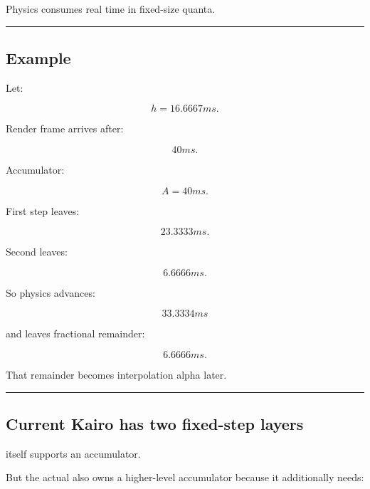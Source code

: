 Physics consumes real time in fixed-size quanta.

\begin{center}\rule{0.5\linewidth}{0.5pt}\end{center}

\begin{allmightroleexample}

\subsection{Example}\label{06-engine-ii-ch037-example}

\hypertarget{06-engine-ii-ch037-example}{}

Let:

\end{allmightroleexample}

\[
h=16.6667ms.
\]

Render frame arrives after:

\[
40ms.
\]

Accumulator:

\[
A=40ms.
\]

First step leaves:

\[
23.3333ms.
\]

Second leaves:

\[
6.6666ms.
\]

So physics advances:

\[
33.3334ms
\]

and leaves fractional remainder:

\[
6.6666ms.
\]

That remainder becomes interpolation alpha later.

\begin{center}\rule{0.5\linewidth}{0.5pt}\end{center}

\subsection{Current Kairo has two fixed-step layers}\label{06-engine-ii-ch037-current-kairo-has-two-fixed-step-layers}

\hypertarget{06-engine-ii-ch037-current-kairo-has-two-fixed-step-layers}{}

 itself supports an accumulator.

But the actual  also owns a higher-level accumulator because it additionally needs:

